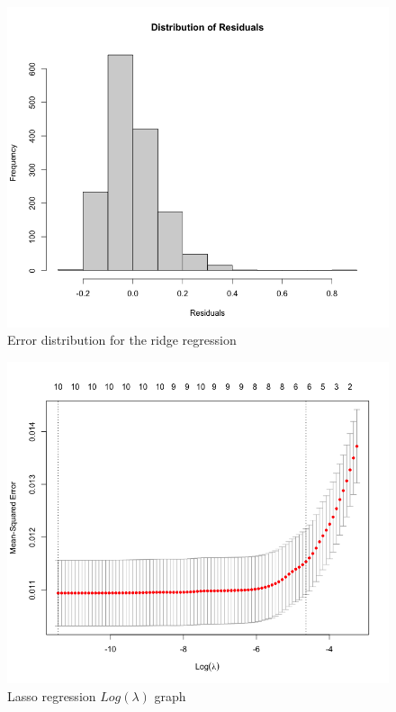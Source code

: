 \documentclass[10pt]{article} %
\begin{document}
     \begin{figure}[h]
        \centering
        \includegraphics[scale=0.45]{Assets/distribution_ridge.png}
        \caption{Error distribution for the ridge regression}
        \label{fig:enter-label}
    \end{figure}
    \begin{figure}[h]
        \centering
        \includegraphics[scale=0.5]{Assets/Lasso.png}
        \caption{Lasso regression $Log(\lambda)$ graph}
        \label{fig:enter-label}
    \end{figure}
\end{document}
